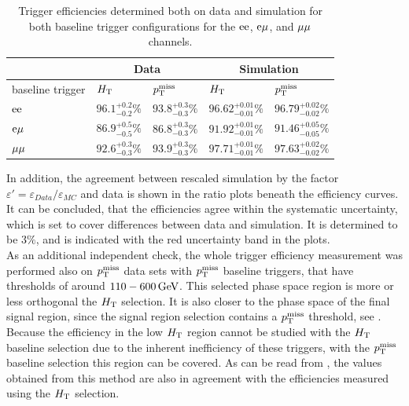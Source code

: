 \begin{table}[htb]
 \centering
 \caption{Trigger efficiencies determined both on data and simulation for both baseline trigger
  configurations for the $\mathrm{e}\mathrm{e}$, $\mathrm{e}{\mu}$, and ${\mu}{\mu}$ channels.}
 \label{tab:triggEff}
 \begin{tabular}{lllll}
                   & \multicolumn{2}{c}{Data} & \multicolumn{2}{c}{Simulation}                                                         \\\hline
  baseline trigger & $H_{\mathrm{T}}$                    & $p_{\mathrm{T}}^\text{miss}$                      & $H_{\mathrm{T}}$                     & $p_{\mathrm{T}}^\text{miss}$                 \\\hline
  $\mathrm{e}\mathrm{e}$         & $96.1^{+0.2}_{-0.2}\%$   & $93.8^{+0.3}_{-0.3}\%$         & $96.62^{+0.01}_{-0.01}\%$ & $96.79^{+0.02}_{-0.02}\%$ \\
  $\mathrm{e}{\mu}$        & $86.9^{+0.5}_{-0.5}\%$   & $86.8^{+0.3}_{-0.3}\%$         & $91.92^{+0.01}_{-0.01}\%$ & $91.46^{+0.05}_{-0.05}\%$ \\
  ${\mu}{\mu}$       & $92.6^{+0.3}_{-0.3}\%$   & $93.9^{+0.3}_{-0.3}\%$         & $97.71^{+0.01}_{-0.01}\%$ & $97.63^{+0.02}_{-0.02}\%$ \\\hline
 \end{tabular}
 \vspace{\baselineskip}
\end{table}


In addition, the agreement between rescaled simulation by the factor $\varepsilon'=\varepsilon_{Data}/\varepsilon_{MC}$ and data is shown in the ratio plots beneath the efficiency curves. It can be concluded, that the efficiencies agree within the systematic uncertainty, which is set to cover differences between data and simulation. It is determined to be $3\%$, and is indicated with the red uncertainty band in the plots.\\

As an additional independent check, the whole trigger efficiency measurement was performed also on $p_{\mathrm{T}}^\text{miss}$ data sets with $p_{\mathrm{T}}^\text{miss}$ baseline triggers, that have thresholds of around $110-600\,\text{Ge\hspace{-.08em}V}$. This selected phase space region is more or less orthogonal the $H_{\mathrm{T}}$ selection. It is also closer to the phase space of the final signal region, since the signal region selection contains a $p_{\mathrm{T}}^\text{miss}$ threshold, see . Because the efficiency in the low $H_{\mathrm{T}}$ region cannot be studied with the $H_{\mathrm{T}}$ baseline selection due to the inherent inefficiency of these triggers, with the $p_{\mathrm{T}}^\text{miss}$ baseline selection this region can be covered. As can be read from , the values obtained from this method are also in agreement with the efficiencies measured using the $H_{\mathrm{T}}$ selection.%
